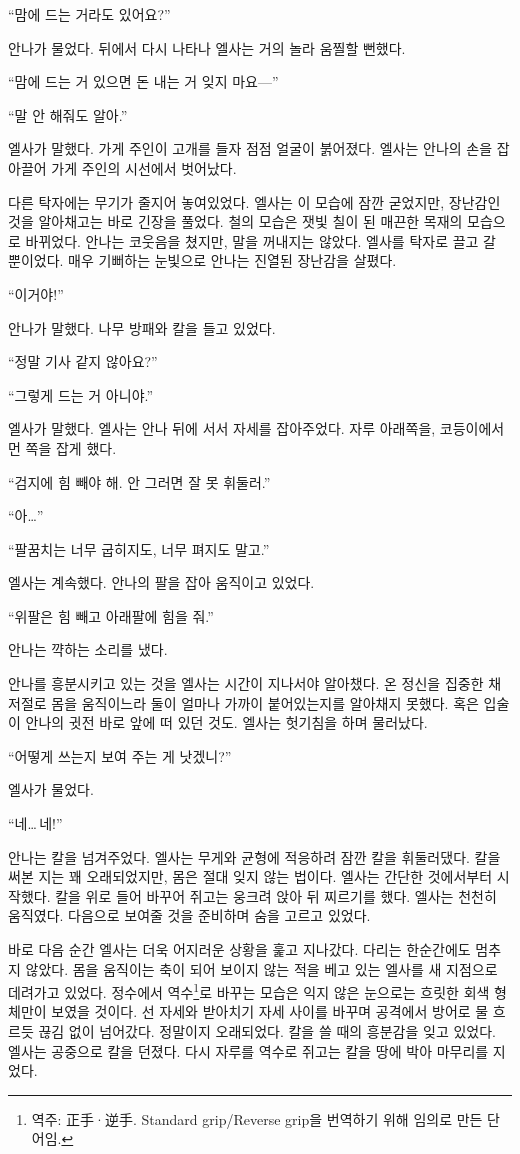 ``맘에 드는 거라도 있어요?''

안나가 물었다. 뒤에서 다시 나타나 엘사는 거의 놀라 움찔할 뻔했다.

``맘에 드는 거 있으면 돈 내는 거 잊지 마요—''

``말 안 해줘도 알아.''

엘사가 말했다. 가게 주인이 고개를 들자 점점 얼굴이 붉어졌다. 엘사는 안나의 손을 잡아끌어 가게 주인의 시선에서 벗어났다.

다른 탁자에는 무기가 줄지어 놓여있었다. 엘사는 이 모습에 잠깐 굳었지만, 장난감인 것을 알아채고는 바로 긴장을 풀었다. 철의 모습은 잿빛 칠이 된 매끈한 목재의 모습으로 바뀌었다. 안나는 코웃음을 쳤지만, 말을 꺼내지는 않았다. 엘사를 탁자로 끌고 갈 뿐이었다. 매우 기뻐하는 눈빛으로 안나는 진열된 장난감을 살폈다.

``이거야!''

안나가 말했다. 나무 방패와 칼을 들고 있었다.

``정말 기사 같지 않아요?''

``그렇게 드는 거 아니야.''

엘사가 말했다. 엘사는 안나 뒤에 서서 자세를 잡아주었다. 자루 아래쪽을, 코등이에서 먼 쪽을 잡게 했다.

``검지에 힘 빼야 해. 안 그러면 잘 못 휘둘러.''

``아\ldots''

``팔꿈치는 너무 굽히지도, 너무 펴지도 말고.''

엘사는 계속했다. 안나의 팔을 잡아 움직이고 있었다.

``위팔은 힘 빼고 아래팔에 힘을 줘.''

안나는 꺅하는 소리를 냈다.

안나를 흥분시키고 있는 것을 엘사는 시간이 지나서야 알아챘다. 온 정신을 집중한 채 저절로 몸을 움직이느라 둘이 얼마나 가까이 붙어있는지를 알아채지 못했다. 혹은 입술이 안나의 귓전 바로 앞에 떠 있던 것도. 엘사는 헛기침을 하며 물러났다.

``어떻게 쓰는지 보여 주는 게 낫겠니?''

엘사가 물었다.

``네\ldots\,네!''

안나는 칼을 넘겨주었다. 엘사는 무게와 균형에 적응하려 잠깐 칼을 휘둘러댔다. 칼을 써본 지는 꽤 오래되었지만, 몸은 절대 잊지 않는 법이다. 엘사는 간단한 것에서부터 시작했다. 칼을 위로 들어 바꾸어 쥐고는 웅크려 앉아 뒤 찌르기를 했다. 엘사는 천천히 움직였다. 다음으로 보여줄 것을 준비하며 숨을 고르고 있었다.

바로 다음 순간 엘사는 더욱 어지러운 상황을 훑고 지나갔다. 다리는 한순간에도 멈추지 않았다. 몸을 움직이는 축이 되어 보이지 않는 적을 베고 있는 엘사를 새 지점으로 데려가고 있었다. 정수에서 역수\footnote{역주: 正手·逆手. Standard grip/Reverse grip을 번역하기 위해 임의로 만든 단어임.}로 바꾸는 모습은 익지 않은 눈으로는 흐릿한 회색 형체만이 보였을 것이다. 선 자세와 받아치기 자세 사이를 바꾸며 공격에서 방어로 물 흐르듯 끊김 없이 넘어갔다. 정말이지 오래되었다. 칼을 쓸 때의 흥분감을 잊고 있었다. 엘사는 공중으로 칼을 던졌다. 다시 자루를 역수로 쥐고는 칼을 땅에 박아 마무리를 지었다.

